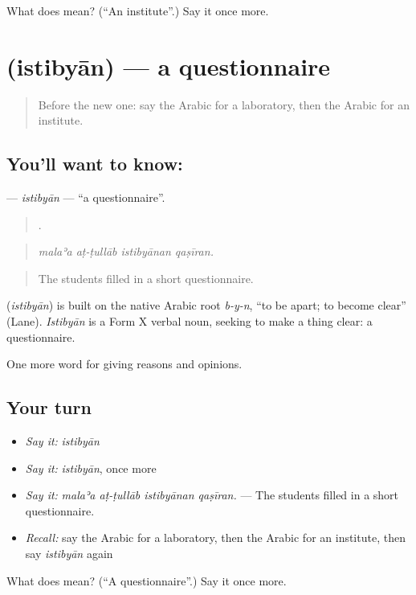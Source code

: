 \begin{tcolorbox}[breakable,colback=teal!4,colframe=teal!35!black,title={Before you move on}]
What does  mean? (\textquotedblleft{}An institute\textquotedblright{}.) Say it once more.
\end{tcolorbox}
\section[\texorpdfstring{\ar{استبيان} (istibyān)}{استبيان (istibyān)}]{ (istibyān) — a questionnaire}

\label{lesson:AR-C391-istibyan}



\begin{quote}
Before the new one: say the Arabic for a laboratory, then the Arabic for an institute.
\end{quote}

\subsection*{You'll want to know: }
\textbf{} — \emph{istibyān} — \textquotedblleft{}a questionnaire\textquotedblright{}.

\begin{quote}
   .
\end{quote}

\begin{quote}
\emph{malaʾa aṭ-ṭullāb istibyānan qaṣīran.}
\end{quote}

\begin{quote}
The students filled in a short questionnaire.
\end{quote}

\begin{cousinweb}
\textbf{} (\emph{istibyān}) is built on the native Arabic root \emph{b-y-n}, \textquotedblleft{}to be apart; to become clear\textquotedblright{} (Lane). \emph{Istibyān} is a Form X verbal noun, seeking to make a thing clear: a questionnaire.
\end{cousinweb}

\begin{grammarlens}[title={What you've built}]
One more word for giving reasons and opinions.
\end{grammarlens}

\subsection*{Your turn}
\begin{itemize}
\raggedright
  \item \emph{Say it:} \emph{istibyān}
  \item \emph{Say it:} \emph{istibyān}, once more
  \item \emph{Say it:} \emph{malaʾa aṭ-ṭullāb istibyānan qaṣīran.} — The students filled in a short questionnaire.
  \item \emph{Recall:} say the Arabic for a laboratory, then the Arabic for an institute, then say \emph{istibyān} again
\end{itemize}

\begin{tcolorbox}[breakable,colback=teal!4,colframe=teal!35!black,title={Before you move on}]
What does  mean? (\textquotedblleft{}A questionnaire\textquotedblright{}.) Say it once more.
\end{tcolorbox}
